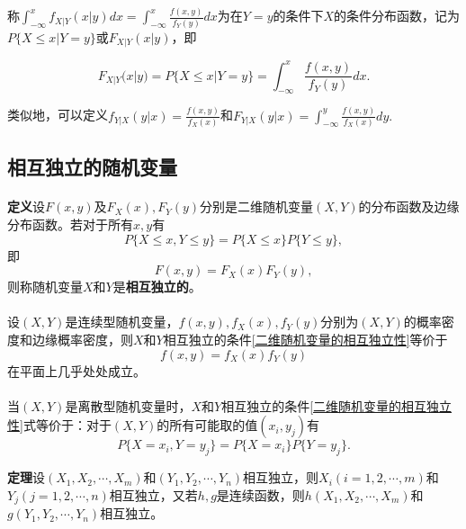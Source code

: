 称$\int_{-\infty}^x f_{X|Y}(x|y)dx = \int_{-\infty}^x \frac{f(x,y)}{f_Y(y)}dx$为在$Y=y$的条件下$X$的条件分布函数，记为$P\{X \leq  x | Y = y\}$或$F_{X|Y}(x|y)$，即

\begin{equation}
  F_{X|Y}(x|y) = P\{X \leq x | Y = y\}=\int_{-\infty}^x\frac{f(x,y)}{f_Y(y)}dx.
\end{equation}

类似地，可以定义$f_{Y|X}(y|x)=\frac{f(x,y)}{f_X(x)}$和$F_{Y|X}(y|x)=\int_{-\infty}^y\frac{f(x,y)}{f_X(x)}dy.$

\subsection{相互独立的随机变量}
\paragraph{}
\textbf{定义\;}设$F(x,y)$及$F_X(x),F_Y(y)$分别是二维随机变量$(X,Y)$的分布函数及边缘分布函数。若对于所有$x,y$有
\begin{equation}
  P\{X \leq x, Y \leq y\} = P\{X \leq x\}P\{Y \leq y\},
\end{equation}
即
\begin{equation}
  \label{二维随机变量的相互独立性}
  F(x,y) = F_X(x)F_Y(y),
\end{equation}
则称随机变量$X$和$Y$是\textbf{相互独立的}。

\paragraph{}
设$(X,Y)$是连续型随机变量，$f(x,y), f_X(x), f_Y(y)$分别为$(X,Y)$的概率密度和边缘概率密度，则$X$和$Y$相互独立的条件\eqref{二维随机变量的相互独立性}等价于
\begin{equation}
  f(x,y)=f_X(x)f_Y(y)
\end{equation}
在平面上几乎处处成立。

\paragraph{}
当$(X,Y)$是离散型随机变量时，$X$和$Y$相互独立的条件\eqref{二维随机变量的相互独立性}式等价于：对于$(X,Y)$的所有可能取的值$(x_i,y_j)$有
\begin{equation}
  P\{X=x_i,Y=y_j\} = P\{X=x_i\}P\{Y=y_j\}.
\end{equation}

\textbf{定理\;}设$(X_1, X_2, \cdots, X_m)$和$(Y_1, Y_2, \cdots, Y_n)$相互独立，则$X_i(i=1,2, \cdots, m)$和$Y_j(j=1,2, \cdots, n)$相互独立，又若$h,g$是连续函数，则$h(X_1,X_2, \cdots, X_m)$和$g(Y_1, Y_2, \cdots, Y_n)$相互独立。
